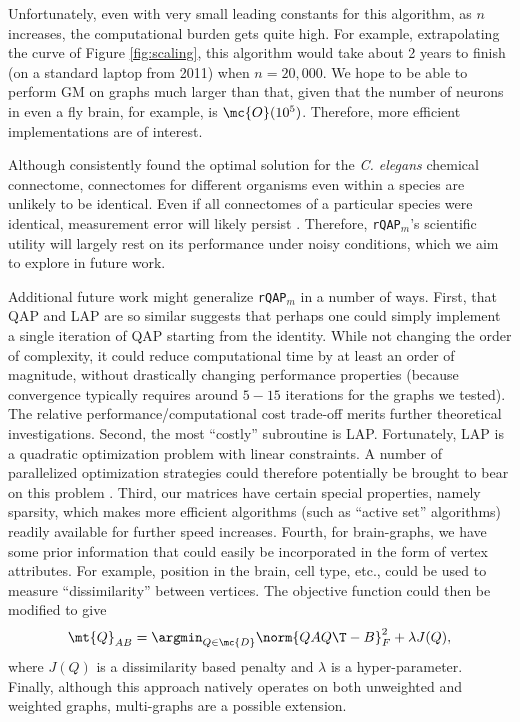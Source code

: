 \documentclass[10pt,journal,cspaper,compsoc]{IEEEtran}
\begin{document}
Unfortunately, even with very small leading constants for this algorithm, as $n$ increases, the computational burden gets quite high.  For example, extrapolating the curve of Figure \ref{fig:scaling}, this algorithm would take about 2 years to finish (on a standard laptop from 2011) when $n=20,000$.  We hope to be able to perform GM on graphs much larger than that, given that the number of neurons in even a fly brain, for example, is $\mc{O}(10^5)$.  Therefore, more efficient implementations are of interest.  

Although \rqapm consistently found the optimal solution for the \emph{C. elegans} chemical connectome, connectomes for different organisms even within a species are unlikely to be identical. Even if all connectomes of a particular species were identical, measurement error will likely persist \cite{Helmstaedter2011}. Therefore, \texttt{rQAP}$_m$'s scientific utility will largely rest on its performance under noisy conditions, which we aim to explore in future work.  

Additional future work might generalize \texttt{rQAP}$_m$ in a number of ways.  First, that QAP and LAP are so similar suggests that perhaps one could simply implement a single iteration of QAP starting from the identity.  While not changing the order of complexity, it could reduce computational time by at least an order of magnitude, without drastically changing performance properties (because convergence typically requires around $5-15$ iterations for the graphs we tested).  The relative performance/computational cost trade-off merits further theoretical investigations.  Second, the most ``costly'' subroutine is LAP.  Fortunately, LAP is a quadratic optimization problem with linear constraints.  A number of parallelized optimization strategies could therefore potentially be brought to bear on this problem \cite{Boyd2011}.  Third, our matrices have certain special properties, namely sparsity, which makes more efficient algorithms (such as ``active set'' algorithms) readily available for further speed increases.  Fourth, for brain-graphs, we have some prior information that could easily be incorporated in the form of vertex attributes.  For example, position in the brain, cell type, etc., could be used to measure ``dissimilarity'' between vertices.  The objective function could then be modified to give
\begin{align} \label{eq:Jqap}
	\mt{Q}_{AB}= \argmin_{Q \in \mc{D}} \norm{Q A Q\T - B}^2_F + \lambda J(Q),
\end{align}
where $J(Q)$ is a dissimilarity based penalty and $\lambda$ is a hyper-parameter.  Finally, although this approach natively operates on both unweighted and weighted graphs, multi-graphs are a possible extension.
\end{document}
